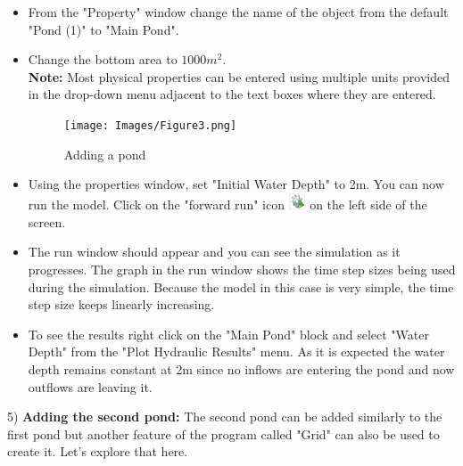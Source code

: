 \begin{itemize}
\item From the "Property" window change the name of the object from the default "Pond (1)" to "Main Pond".  
\item Change the bottom area to $1000 m^2$. \\
\textbf{Note:} Most physical properties can be entered using multiple units provided in the drop-down menu adjacent to the text boxes where they are entered. 
\begin{figure}[!ht]\label{fig:3}
\begin{center}
\texttt{[image: Images/Figure3.png]} \\
\caption{Adding a pond} 
\end{center}
\end{figure}
\item Using the properties window, set "Initial Water Depth" to 2m. 
You can now run the model. Click on the "forward run" icon \includegraphics[width=0.5cm]{Icons/run_icon.png} on the left side of the screen. 
\item The run window should appear and you can see the simulation as it progresses. The graph in the run window shows the time step sizes being used during the simulation. Because the model in this case is very simple, the time step size keeps linearly increasing. 
\item To see the results right click on the "Main Pond" block and select "Water Depth" from the "Plot Hydraulic Results" menu. As it is expected the water depth remains constant at 2m since no inflows are entering the pond and now outflows are leaving it. 
\end{itemize}
5) \textbf{Adding the second pond: }
The second pond can be added similarly to the first pond but another feature of the program called "Grid" can also be used to create it. Let's explore that here. 

